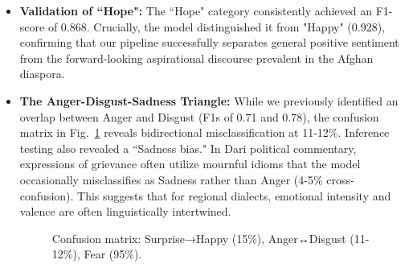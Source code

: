 \documentclass[runningheads]{llncs}
\begin{document}
\begin{itemize}
\item \textbf{Validation of ``Hope":} The ``Hope" category consistently achieved 
an F1-score of 0.868. Crucially, the model distinguished it from "Happy" 
(0.928), confirming that our pipeline successfully separates general positive 
sentiment from the forward-looking aspirational discourse prevalent in the 
Afghan diaspora.

\item \textbf{The Anger-Disgust-Sadness Triangle:} While we previously 
identified an overlap between Anger and Disgust (F1s of 0.71 and 0.78), the 
confusion matrix in Fig.~\ref{fig:confusion} reveals bidirectional 
misclassification at 11-12\%. Inference testing also revealed a ``Sadness bias." 
In Dari political commentary, expressions of grievance often utilize mournful 
idioms that the model occasionally misclassifies as Sadness rather than Anger 
(4-5\% cross-confusion). This suggests that for regional dialects, emotional 
intensity and valence are often linguistically intertwined.

\begin{figure}[H]
\centering
{}
\caption{Confusion matrix: Surprise→Happy (15\%), Anger↔Disgust (11-12\%), Fear (95\%).}
\label{fig:confusion}
\end{figure}


\end{itemize}
\end{document}
